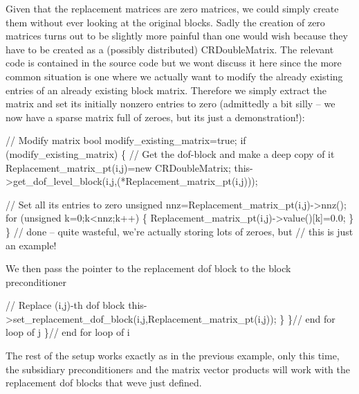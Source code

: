Given that the replacement matrices are zero matrices, we could simply create them without ever looking at the original blocks. Sadly the creation of zero matrices turns out to be slightly more painful than one would wish because they have to be created as a (possibly distributed) {\ttfamily C\+R\+Double\+Matrix}. The relevant code is contained in the source code but we won\textquotesingle{}t discuss it here since the more common situation is one where we actually want to modify the already existing entries of an already existing block matrix. Therefore we simply extract the matrix and set its initially nonzero entries to zero (admittedly a bit silly -- we now have a sparse matrix full of zeroes, but it\textquotesingle{}s just a demonstration!)\+:


\begin{DoxyCodeInclude}
        \textcolor{comment}{// Modify matrix}
        \textcolor{keywordtype}{bool} modify\_existing\_matrix=\textcolor{keyword}{true};
        \textcolor{keywordflow}{if} (modify\_existing\_matrix)
         \{
          \textcolor{comment}{// Get the dof-block and make a deep copy of it}
          Replacement\_matrix\_pt(i,j)=\textcolor{keyword}{new} CRDoubleMatrix;
          this->get\_dof\_level\_block(i,j,(*Replacement\_matrix\_pt(i,j))); 
          
          \textcolor{comment}{// Set all its entries to zero}
          \textcolor{keywordtype}{unsigned} nnz=Replacement\_matrix\_pt(i,j)->nnz();
          \textcolor{keywordflow}{for} (\textcolor{keywordtype}{unsigned} k=0;k<nnz;k++)
           \{
            Replacement\_matrix\_pt(i,j)->value()[k]=0.0;
           \}
         \} \textcolor{comment}{// done -- quite wasteful, we're actually storing lots of zeroes, but}
           \textcolor{comment}{// this is just an example!}

\end{DoxyCodeInclude}


We then pass the pointer to the replacement dof block to the block preconditioner


\begin{DoxyCodeInclude}
        \textcolor{comment}{// Replace (i,j)-th dof block}
        this->set\_replacement\_dof\_block(i,j,Replacement\_matrix\_pt(i,j));
       \}
     \}\textcolor{comment}{// end for loop of j}
   \}\textcolor{comment}{// end for loop of i}

\end{DoxyCodeInclude}


The rest of the setup works exactly as in the previous example, only this time, the subsidiary preconditioners and the matrix vector products will work with the replacement dof blocks that we\textquotesingle{}ve just defined.

